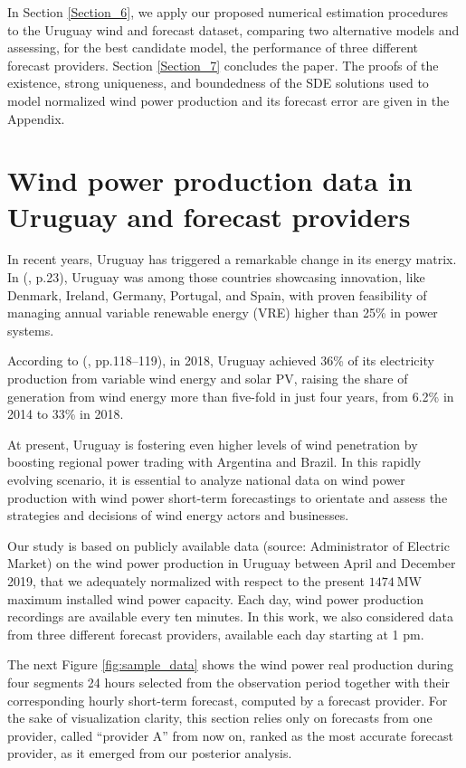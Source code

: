 \documentclass[11pt]{article}
\theoremstyle{definition}
\begin{document}
In Section \ref{Section_6}, we apply our proposed numerical estimation procedures to the Uruguay wind and forecast dataset, comparing two alternative models and assessing, for the best candidate model, the performance of three different forecast providers. Section \ref{Section_7} concludes the paper. 
The proofs of the existence, strong uniqueness, and boundedness of the SDE solutions used to model normalized wind power production and its forecast error are given in the Appendix.



\section{Wind power production data in Uruguay and forecast providers } \label{Section_2}

In recent years, Uruguay has triggered a remarkable change in its energy matrix. In (\cite{irena}, p.23), Uruguay was among those countries showcasing innovation, like Denmark, Ireland, Germany, Portugal, and Spain, with proven feasibility of managing annual variable renewable energy (VRE) higher than 25\% in power systems. 

According to (\cite{ren21}, pp.118--119), in 2018, Uruguay achieved 36\% of its electricity production from variable wind energy and solar PV, raising the share of generation from wind energy more than five-fold in just four years, from 6.2\% in 2014 to 33\% in 2018. 

At present, Uruguay is fostering even higher levels of wind penetration by boosting regional power trading with Argentina and Brazil. 
In this rapidly evolving scenario, it is essential to analyze national data on wind power production with wind power short-term forecastings to orientate and assess the strategies and decisions of wind energy actors and businesses. 

Our study is based on publicly available data (source: Administrator of Electric Market) on the wind power production in Uruguay between April and December 2019, that we adequately normalized with respect to the present $\SI{1474}{\mega\watt}$ maximum installed wind power capacity. Each day, wind power production recordings are available every ten minutes.  In this work, we also considered data from three different forecast providers, available each day starting at 1 pm.

The next Figure \ref{fig:sample_data} shows the wind power real production during four segments 24 hours selected from the observation period together with their corresponding hourly short-term forecast, computed by a forecast provider. For the sake of visualization clarity, this section relies only on forecasts from one provider, called ``provider A'' from now on, ranked as the most accurate forecast provider, as it emerged from our posterior analysis.
\end{document}
